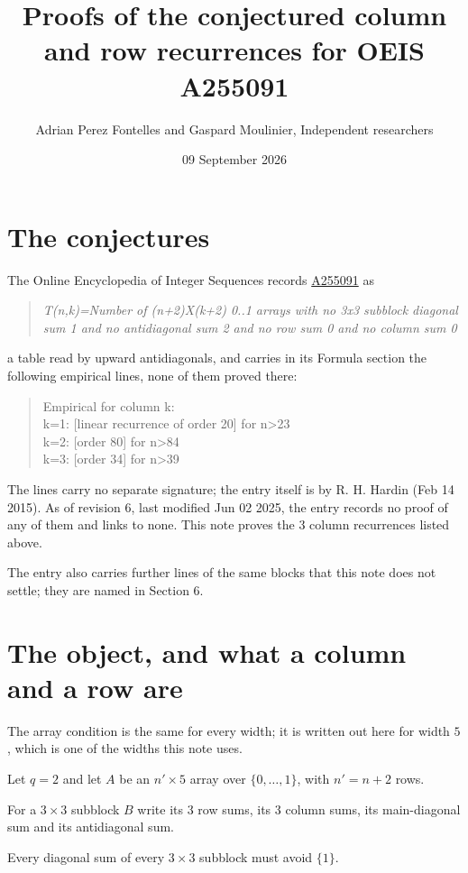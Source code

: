 \documentclass[11pt]{article}
\title{Proofs of the conjectured column and row recurrences for OEIS A255091}
\author{Adrian Perez Fontelles and Gaspard Moulinier, Independent researchers}
\date{09 September 2026}
\theoremstyle{definition}
\begin{document}
\maketitle
\section{The conjectures}

The Online Encyclopedia of Integer Sequences records \href{https://oeis.org/A255091}{A255091} as

\begin{quote}\itshape T(n,k)=Number of (n+2)X(k+2) 0..1 arrays with no 3x3 subblock diagonal sum 1 and no antidiagonal sum 2 and no row sum 0 and no column sum 0\end{quote}

a table read by upward antidiagonals, and carries in its Formula section the following empirical lines, none of them proved there:

\begin{quote}\ttfamily Empirical for column k:\\
k=1: [linear recurrence of order 20] for n>23\\k=2: [order 80] for n>84\\k=3: [order 34] for n>39\end{quote}

The lines carry no separate signature; the entry itself is by R. H. Hardin (Feb 14 2015). As of revision 6, last modified Jun 02 2025, the entry records no proof of any of them and links to none. This note proves the 3 column recurrences listed above.

The entry also carries further lines of the same blocks that this note does not settle; they are named in Section 6.

\section{The object, and what a column and a row are}

The array condition is the same for every width; it is written out here for width $5$, which is one of the widths this note uses.

Let $q = 2$ and let $A$ be an $n' \times 5$ array over $\{0,\dots,1\}$, with $n' = n + 2$ rows.

For a $3\times3$ subblock $B$ write its 3 row sums, its 3 column sums, its main-diagonal sum and its antidiagonal sum.

Every diagonal sum of every $3\times3$ subblock must avoid $\{1\}$.
\end{document}
